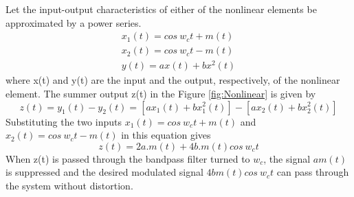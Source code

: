 Let the input-output characteristics of either of the nonlinear elements be approximated by a power series.
\begin{equation*}
  \begin{split}
    x_1(t) = cos~w_ct + m(t)\\
    x_2(t) = cos~w_ct - m(t)\\
    y(t) = a x(t) + bx^2(t)
  \end{split}
\end{equation*}
where x(t) and y(t) are the input and the output, respectively, of the nonlinear element. The summer output z(t) in the Figure \ref{fig:Nonlinear} is given by
\begin{equation*}
  z(t) = y_1(t) - y_2(t) = [ax_1(t) + bx_1^2(t)] - [ax_2(t) + bx_2^2(t)]
\end{equation*}
Substituting the two inputs $x_1(t) = cos~w_ct + m(t)$ and $x_2(t) = cos~w_ct - m(t)$ in this equation gives
\begin{equation*}
    z(t) = 2a.m(t) + 4b.m(t)cos~w_ct
\end{equation*}
When z(t) is passed through the bandpass filter turned to $w_c$, the signal $am(t)$ is suppressed and the desired modulated signal $4bm(t)cos~w_ct$ can pass through the system without distortion.

